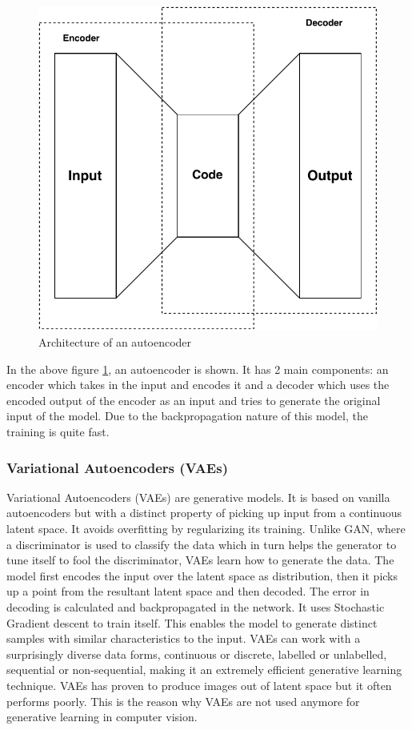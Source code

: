 \documentclass[conference]{IEEEtran}
\begin{document}
\begin{figure}[!h]
    \centerline{\includegraphics[scale=0.6]{figures/AE.pdf}}
    \caption{Architecture of an autoencoder}
    \label{fig4}
\end{figure}

In the above figure \ref{fig4}, an autoencoder is shown. It has 2 main components: an encoder which takes in the input and encodes it and a decoder which uses the encoded output of the encoder as an input and tries to generate the original input of the model. Due to the backpropagation nature of this model, the training is quite fast.

\subsubsection{Variational Autoencoders (VAEs)}
Variational Autoencoders (VAEs) are generative models. It is based on vanilla autoencoders but with a distinct property of picking up input from a continuous latent space. It avoids overfitting by regularizing its training. Unlike GAN, where a discriminator is used to classify the data which in turn helps the generator to tune itself to fool the discriminator, VAEs learn how to generate the data. The model first encodes the input over the latent space as distribution, then it picks up a point from the resultant latent space and then decoded. The error in decoding is calculated and backpropagated in the network. It uses Stochastic Gradient descent to train itself. This enables the model to generate distinct samples with similar characteristics to the input. VAEs can work with a surprisingly diverse data forms, continuous or discrete, labelled or unlabelled, sequential or non-sequential, making it an extremely efficient generative learning technique. VAEs has proven to produce images out of latent space but it often performs poorly. This is the reason why VAEs are not used anymore for generative learning in computer vision.
\end{document}
